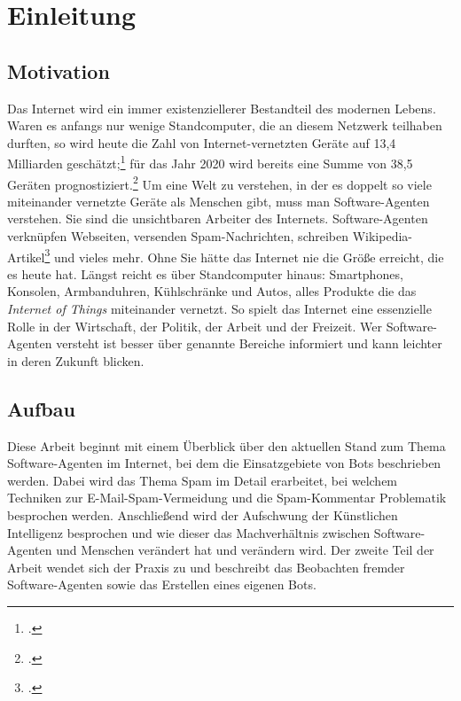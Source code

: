 \section{Einleitung}
\label{sec:einleitung}

\subsection{Motivation}
\label{sub:motivation}

Das Internet wird ein immer existenziellerer Bestandteil des modernen Lebens.
Waren es anfangs nur wenige Standcomputer, die an diesem Netzwerk teilhaben
durften, so wird heute die Zahl von Internet-vernetzten Geräte auf 13,4
Milliarden geschätzt;\footcite{iotTripleBy2020} für das Jahr 2020 wird bereits
eine Summe von 38,5 Geräten prognostiziert.\footcite{iotTripleBy2020} Um eine
Welt zu verstehen, in der es doppelt so viele miteinander vernetzte Geräte als
Menschen gibt, muss man Software-Agenten verstehen. Sie sind die unsichtbaren
Arbeiter des Internets. Software-Agenten verknüpfen Webseiten, versenden
Spam-Nachrichten, schreiben Wikipedia-Artikel\footcite{botWritingForWikipedia}
und vieles mehr. Ohne Sie hätte das Internet nie die Größe erreicht, die es
heute hat. Längst reicht es über Standcomputer hinaus: Smartphones, Konsolen,
Armbanduhren, Kühlschränke und Autos, alles Produkte die das \emph{Internet of
Things} miteinander vernetzt. So spielt das Internet eine essenzielle Rolle in
der Wirtschaft, der Politik, der Arbeit und der Freizeit. Wer Software-Agenten
versteht ist besser über genannte Bereiche informiert und kann leichter in
deren Zukunft blicken.

\subsection{Aufbau}
\label{sub:aufbau}

Diese Arbeit beginnt mit einem Überblick über den aktuellen Stand zum Thema
Software-Agenten im Internet, bei dem die Einsatzgebiete von
Bots beschrieben werden. Dabei wird
das Thema Spam im Detail erarbeitet, bei welchem Techniken
zur E-Mail-Spam-Vermeidung und die
Spam-Kommentar Problematik besprochen werden.
Anschließend wird der Aufschwung der Künstlichen Intelligenz
besprochen und wie dieser das
Machverhältnis zwischen Software-Agenten und Menschen verändert hat und
verändern wird. Der zweite Teil der Arbeit wendet sich der Praxis zu und
beschreibt das Beobachten fremder
Software-Agenten sowie das Erstellen
eines eigenen Bots.

